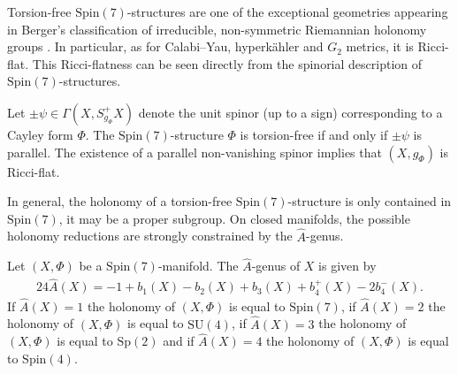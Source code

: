 \documentclass[psamsfonts]{amsart}
\theoremstyle{plain}
\theoremstyle{definition}{
\newtheorem{defi}{Definition}[section]
\newtheorem{ass}{Assumption}
\newtheorem*{nota}{Notation}}
\theoremstyle{remark}{
\newtheorem{rem}{Remark}
\newtheorem{ex}{Example}}
\theoremstyle{plain}{
\newtheorem{thm}{Theorem}[section]
\newtheorem{lem}{Lemma}[section]
\newtheorem{cor}{Corollary}[section]
\newtheorem{prop}{Proposition}[section]
\newtheorem{con}{Conjecture}[section]}
\newcommand{\m}[1]{{\mathrm{#1}}}
\begin{document}

Torsion-free $\m{Spin}(7)$-structures are one of the exceptional geometries appearing in Berger's classification of irreducible, non-symmetric Riemannian
holonomy groups \cite{berger}. In particular, as for Calabi--Yau, hyperkähler and $G_2$ metrics, it is Ricci-flat. This Ricci-flatness can be seen directly from the spinorial description of $\m{Spin}(7)$-structures.


\begin{prop}\cite[Prop. 10.5.6]{joyce2000compact}
\label{parallelspinor}
Let $\pm\psi\in \Gamma(X,S^+_{g_\Phi}X)$ denote the unit spinor (up to a sign) corresponding to a Cayley form $\Phi$. The $\m{Spin}(7)$-structure $\Phi$ is torsion-free if and only if $\pm\psi$ is parallel. The existence of a parallel non-vanishing spinor implies that $(X,g_\Phi)$ is Ricci-flat. 
\end{prop}

In general, the holonomy of a torsion-free $\m{Spin}(7)$-structure is only contained in $\m{Spin}(7)$, it may be a proper subgroup. On closed manifolds, the possible holonomy reductions are strongly constrained by the
$\hat{A}$-genus.

\begin{prop}\cite[Thm. 10.6.1]{joyce2000compact}
Let $(X,\Phi)$ be a $\m{Spin}(7)$-manifold. The $\hat{A}$-genus of $X$ is given by 
\begin{align*}
    24\hat{A}(X)=-1+b_1(X)-b_2(X)+b_3(X)+b_4^+(X)-2b_4^-(X).
\end{align*}
If $\hat{A}(X)=1$ the holonomy of $(X,\Phi)$ is equal to $\m{Spin}(7)$, if $\hat{A}(X)=2$ the holonomy of $(X,\Phi)$ is equal to $\m{SU}(4)$, if $\hat{A}(X)=3$ the holonomy of $(X,\Phi)$ is equal to $\m{Sp}(2)$ and if $\hat{A}(X)=4$ the holonomy of $(X,\Phi)$ is equal to $\m{Spin}(4)$.
\end{prop}
\end{document}
